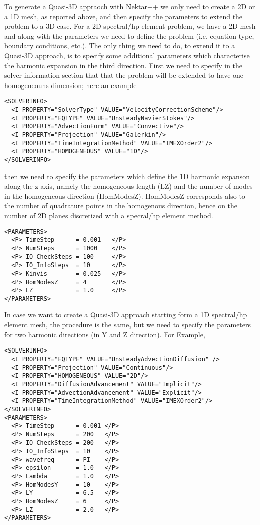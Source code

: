 To generate a Quasi-3D appraoch with Nektar++ we only need to create a 2D or a
1D mesh, as reported above, and then specify the parameters to extend the
problem to a 3D case. For a 2D spectral/hp element problem, we have a 2D mesh
and along with the parameters we need to define the problem (i.e. equation type,
boundary conditions, etc.). The only thing we need to do, to extend it to a
Quasi-3D approach, is to specify some additional parameters which characterise
the harmonic expansion in the third direction. First we need to specify in the
solver information section that that the problem will be extended to have one
homogeneouns dimension; here an example

\begin{lstlisting}[style=XMLStyle]
<SOLVERINFO>
  <I PROPERTY="SolverType" VALUE="VelocityCorrectionScheme"/>
  <I PROPERTY="EQTYPE" VALUE="UnsteadyNavierStokes"/>
  <I PROPERTY="AdvectionForm" VALUE="Convective"/>
  <I PROPERTY="Projection" VALUE="Galerkin"/>
  <I PROPERTY="TimeIntegrationMethod" VALUE="IMEXOrder2"/>
  <I PROPERTY="HOMOGENEOUS" VALUE="1D"/>
</SOLVERINFO>
\end{lstlisting}

then we need to specify the parameters which define the 1D harmonic expanson
along the z-axis, namely the homogeneous length (LZ) and the number of modes in
the homogeneous direction (HomModesZ). HomModesZ corresponds also to the number
of quadrature points in the homogenous direction, hence on the number of 2D
planes discretized with a specral/hp element method.

\begin{lstlisting}[style=XMLStyle]
<PARAMETERS>
  <P> TimeStep      = 0.001   </P>
  <P> NumSteps      = 1000    </P>
  <P> IO_CheckSteps = 100     </P>
  <P> IO_InfoSteps  = 10      </P>
  <P> Kinvis        = 0.025   </P>
  <P> HomModesZ     = 4       </P>
  <P> LZ            = 1.0     </P>
</PARAMETERS>
\end{lstlisting}

In case we want to create a Quasi-3D approach starting form a 1D spectral/hp
element mesh, the procedure is the same, but we need to specify the parameters
for two harmonic directions (in Y and Z direction). For Example,

\begin{lstlisting}[style=XMLStyle]
<SOLVERINFO>
  <I PROPERTY="EQTYPE" VALUE="UnsteadyAdvectionDiffusion" />
  <I PROPERTY="Projection" VALUE="Continuous"/>
  <I PROPERTY="HOMOGENEOUS" VALUE="2D"/>
  <I PROPERTY="DiffusionAdvancement" VALUE="Implicit"/>
  <I PROPERTY="AdvectionAdvancement" VALUE="Explicit"/>
  <I PROPERTY="TimeIntegrationMethod" VALUE="IMEXOrder2"/>
</SOLVERINFO>
<PARAMETERS>
  <P> TimeStep      = 0.001 </P>
  <P> NumSteps      = 200   </P>
  <P> IO_CheckSteps = 200   </P>
  <P> IO_InfoSteps  = 10    </P>
  <P> wavefreq      = PI    </P>
  <P> epsilon       = 1.0   </P>
  <P> Lambda        = 1.0   </P>
  <P> HomModesY     = 10    </P>
  <P> LY            = 6.5   </P>
  <P> HomModesZ     = 6     </P>
  <P> LZ            = 2.0   </P>
</PARAMETERS>
\end{lstlisting}

